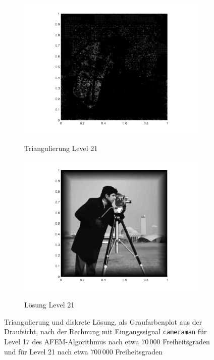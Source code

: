 \begin{figure}[p]
  \begin{subfigure}[b]{.48\linewidth}
    \centering
    \caption{Triangulierung Level 21}
    \includegraphics[trim = 100 30 80 20, clip, width=\linewidth]
      {pictures/chapExperiments/secGrayscale/cam/adaptive/lvl21/triangulation.png}
    \label{fig:camLvl21Triang}
  \end{subfigure}
  \quad
  \begin{subfigure}[b]{.48\linewidth}
    \centering
    \caption{Lösung Level 21}
    \includegraphics[trim = 100 30 80 20, clip, width=\linewidth]
      {pictures/chapExperiments/secGrayscale/cam/adaptive/lvl21/solutionGrayscale.png}
    \label{fig:camLvl21Sol}
  \end{subfigure}
  \caption{Triangulierung und diskrete Lösung, als Graufarbenplot aus der
    Draufsicht, nach der Rechnung mit Eingangssignal \texttt{cameraman} für
    Level 17 des AFEM-Algorithmus nach etwa 70\,000 Freiheitsgraden und für
    Level 21 nach etwa 700\,000 Freiheitsgraden}
  \label{fig:camTriang}
\end{figure}
